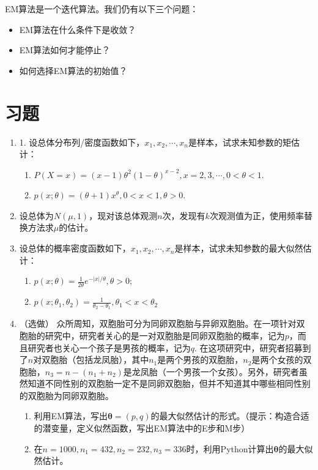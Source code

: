 \begin{problem}
    EM算法是一个迭代算法。我们仍有以下三个问题：
    \begin{itemize}
    \item EM算法在什么条件下是收敛？
    \item EM算法如何才能停止？
    \item 如何选择EM算法的初始值？
    \end{itemize}
\end{problem}
\begin{note}
    \vspace{5cm}
\end{note}

\section{习题}
\begin{enumerate}
    \item 1. 设总体分布列/密度函数如下，$x_1,x_2,\cdots,x_n$是样本，试求未知参数的矩估计：
\begin{enumerate}
    \item $P(X = x) = (x-1)\theta^{2} (1-\theta)^{x-2},x=2,3,\cdots, 0<\theta<1$.
\item  $p(x;\theta) = (\theta+1) x^{\theta}, 0<x<1, \theta>0$.
\end{enumerate}

\item  设总体为$N(\mu,1)$，现对该总体观测$n$次，发现有$k$次观测值为正，使用频率替换方法求$\mu$的估计。

\item  设总体的概率密度函数如下，$x_1,x_2,\cdots,x_n$是样本，试求未知参数的最大似然估计：
\begin{enumerate}
    \item $p(x;\theta) = \frac{1}{2\theta} e^{-|x|/\theta}, \theta> 0$;
\item $p(x;\theta_1,\theta_2) = \frac{1}{\theta_2-\theta_1}, \theta_1 < x < \theta_2$
\end{enumerate}

\item （选做）
    众所周知，双胞胎可分为同卵双胞胎与异卵双胞胎。在一项针对双胞胎的研究中，研究者关心的是一对双胞胎是同卵双胞胎的概率，记为$p$，而且研究者也关心一个孩子是男孩的概率，记为$q$. 在这项研究中，研究者招募到了$n$对双胞胎（包括龙凤胎），其中$n_1$是两个男孩的双胞胎，$n_2$是两个女孩的双胞胎，$n_3= n-(n_1+n_2)$是龙凤胎（一个男孩一个女孩）。另外，研究者虽然知道不同性别的双胞胎一定不是同卵双胞胎，但并不知道其中哪些相同性别的双胞胎为同卵双胞胎。
    \begin{enumerate}
        \item 利用EM算法，写出$\bm{\theta} = (p,q)$的最大似然估计的形式。（提示：构造合适的潜变量，定义似然函数，写出EM算法中的E步和M步）
        \item 在$n = 1000, n_1 = 432, n_2 = 232, n_3 = 336$时，利用Python计算出$\bm{\theta}$的最大似然估计。
    \end{enumerate}


\end{enumerate}

